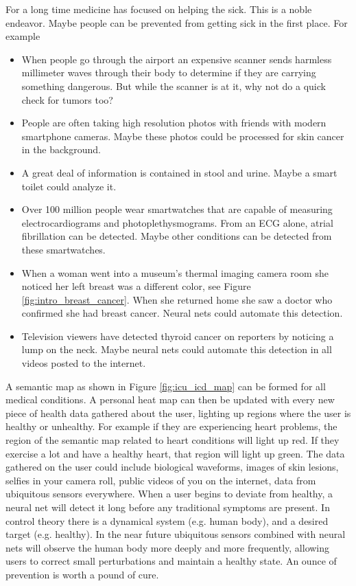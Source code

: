 For a long time medicine has focused on helping the sick.  This is a noble endeavor.  Maybe people can be prevented from getting sick in the first place.  For example

\begin{itemize}
    \item When people go through the airport an expensive scanner sends harmless millimeter waves through their body to determine if they are carrying something dangerous.  But while the scanner is at it, why not do a quick check for tumors too?
    \item People are often taking high resolution photos with friends with modern smartphone cameras.  Maybe these photos could be processed for skin cancer in the background.
    \item A great deal of information is contained in stool and urine.  Maybe a smart toilet could analyze it.
    \item Over 100 million people wear smartwatches that are capable of measuring electrocardiograms and photoplethysmograms.  From an ECG alone, atrial fibrillation can be detected.  Maybe other conditions can be detected from these smartwatches.
    \item When a woman went into a museum's thermal imaging camera room she noticed her left breast was a different color, see Figure \ref{fig:intro_breast_cancer}.  When she returned home she saw a doctor who confirmed she had breast cancer.  Neural nets could automate this detection.
    \item Television viewers have detected thyroid cancer on reporters by noticing a lump on the neck.  Maybe neural nets could automate this detection in all videos posted to the internet.
\end{itemize}

A semantic map as shown in Figure \ref{fig:icu_icd_map} can be formed for all medical conditions.  A personal heat map can then be updated with every new piece of health data gathered about the user, lighting up regions where the user is healthy or unhealthy.  For example if they are experiencing heart problems, the region of the semantic map related to heart conditions will light up red.  If they exercise a lot and have a healthy heart, that region will light up green.  The data gathered on the user could include biological waveforms, images of skin lesions, selfies in your camera roll, public videos of you on the internet, data from ubiquitous sensors everywhere.  When a user begins to deviate from healthy, a neural net will detect it long before any traditional symptoms are present.  In control theory there is a dynamical system (e.g. human body), and a desired target (e.g. healthy). In the near future ubiquitous sensors combined with neural nets will observe the human body more deeply and more frequently, allowing users to correct small perturbations and maintain a healthy state.  An ounce of prevention is worth a pound of cure.